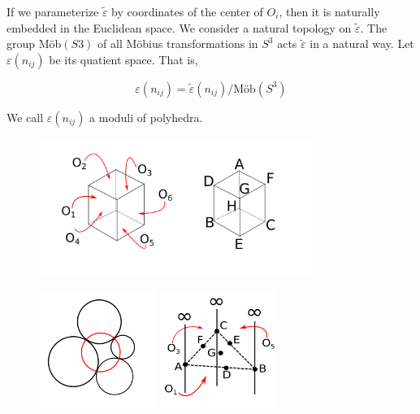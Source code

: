 \documentclass[dvipdfmx]{interact}
\theoremstyle{plain}%
\theoremstyle{definition}
\theoremstyle{remark}
\theoremstyle{problemstyle}
\begin{document}
If we parameterize $\tilde\varepsilon$ by coordinates of the center of
$O_i$, then it is naturally embedded in the Euclidean space. We consider
a natural topology on $\tilde\varepsilon$. The group M\"ob$(S3)$ of all
M\"obius transformations in $S^3$ acts $\tilde\varepsilon$ in a natural way.
Let $\varepsilon(n_{ij})$ be its quatient space. That is,

$$
\varepsilon (n_{ij}) = \tilde\varepsilon(n_{ij}) / \text{M\"ob}(S^3)
$$

We call $\varepsilon(n_{ij})$ a moduli of polyhedra.

\begin{figure}[h!tbp]
 \centering
 \includegraphics[width=3.5in,
 keepaspectratio]{./img/HexahedraWithSphericalFaces/cubes.png}
 \caption{}
 \label{fig:cubes}
\end{figure}

\begin{figure}[h!tbp]
 \begin{minipage}[t]{0.5\textwidth}
 \centering
 \includegraphics[width=1.5in, height=1.5in,
 keepaspectratio]{./img/HexahedraWithSphericalFaces/chain.png}
 \caption{}
 \label{fig:chainCircles}
 \end{minipage}
 \hspace*{\fill}
 \begin{minipage}[t]{0.5\textwidth}
  \centering
  \includegraphics[width=1.5in, height=1.5in,
  keepaspectratio]{./img/HexahedraWithSphericalFaces/infTriangle.png}
  \caption{}
  \label{fig:infTriangle}
 \end{minipage}
 \hspace*{\fill}
\end{figure}
\end{document}
